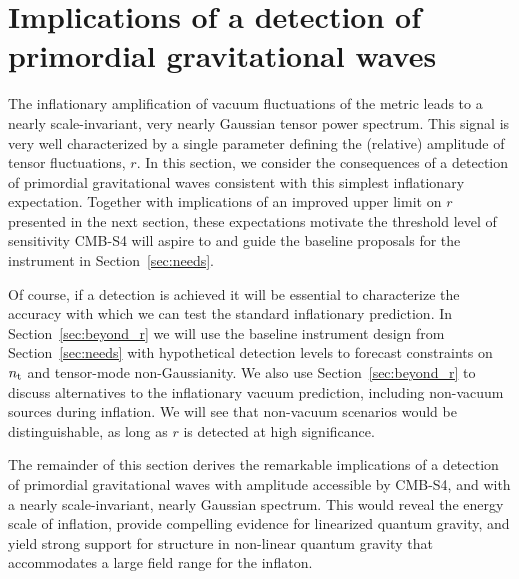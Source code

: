 \section{Implications of a detection of primordial gravitational waves}
\label{sec:detection}

The inflationary amplification of vacuum fluctuations of the metric leads to a nearly scale-invariant, very nearly Gaussian tensor power spectrum. This signal is very well characterized by a single parameter defining the (relative) amplitude of tensor fluctuations, $r$. In this section, we consider the consequences of a detection of primordial gravitational waves consistent with this simplest inflationary expectation. Together with implications of an improved upper limit on $r$ presented in the next section, these expectations motivate the threshold level of sensitivity CMB-S4 will aspire to and guide the baseline proposals for the instrument in Section~\ref{sec:needs}. 

Of course, if a detection is achieved it will be essential to characterize the accuracy with which we can test the standard inflationary prediction. In Section~\ref{sec:beyond_r} we will use the baseline instrument design from Section~\ref{sec:needs} with hypothetical detection levels to forecast constraints on $n_{\rm t}$ and tensor-mode non-Gaussianity. We also use Section~\ref{sec:beyond_r} to discuss alternatives to the inflationary vacuum prediction, including non-vacuum sources during inflation. We will see that non-vacuum scenarios would be distinguishable, as long as $r$ is detected at high significance.

The remainder of this section derives the remarkable implications of a detection of primordial gravitational waves with amplitude accessible by CMB-S4, and with a nearly scale-invariant, nearly Gaussian spectrum.  This would reveal the energy scale of inflation, provide compelling evidence for linearized quantum gravity, and yield strong support for structure in non-linear quantum gravity that accommodates a large field range for the inflaton. 

